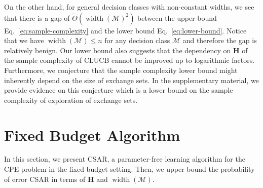 \documentclass{article}
\newcommand{\Algorithm}{{\small \textsf{CLUCB}}\xspace}
\newcommand{\AlgorithmBud}{{\small \textsf{CSAR}}\xspace}
\newcommand{\Problem}{{CPE}\xspace}
\newcommand{\M}{\mathcal M}
\DeclareMathOperator{\rank}{width}
\newcommand{\Match}{\textsc{Match}\xspace}
\newcommand{\Path}{\textsc{Path}\xspace}
\begin{document}
On the other hand, for general decision classes with non-constant widths, we see that there is a gap of $\tilde \Theta(\rank(\M)^2)$ between the upper bound Eq.~\eqref{eq:sample-complexity} and the lower bound Eq.~\eqref{eq:lower-bound}.
Notice that we have $\rank(\M) \le n$ for any decision class $\M$ and therefore the gap is relatively benign.
Our lower bound also suggests that the dependency on $\mathbf H$ of the sample complexity of \Algorithm cannot be improved up to logarithmic factors.
Furthermore, we conjecture that the sample complexity lower bound might inherently depend on the size of exchange sets. 
In the supplementary material, we provide evidence on this conjecture which is a lower bound on the sample complexity of exploration of exchange sets.

\vspace{-0.5em}
\section{Fixed Budget Algorithm}
\vspace{-0.5em}
In this section, we present \AlgorithmBud, a parameter-free learning algorithm for the \Problem problem in the fixed budget setting.
Then, we upper bound the probability of error \AlgorithmBud in terms of $\mathbf H$ and $\rank(\M)$.
\end{document}
